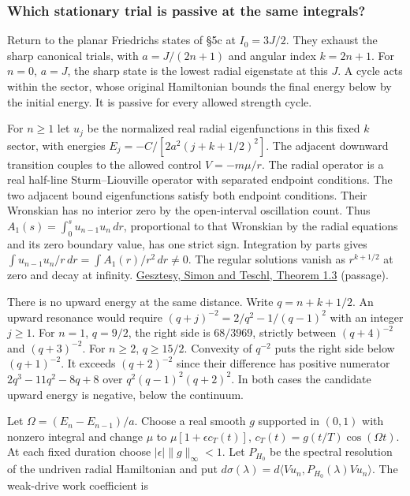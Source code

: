\documentclass[11pt,a4paper]{article}
\begin{document}
\subsubsection{Which stationary trial is passive at the same
integrals?}\label{which-stationary-trial-is-passive-at-the-same-integrals}

Return to the planar Friedrichs states of §5c at \(I_0=3J/2\). They
exhaust the sharp canonical trials, with \(a=J/(2n+1)\) and angular
index \(k=2n+1\). For \(n=0\), \(a=J\), the sharp state is the lowest
radial eigenstate at this \(J\). A cycle acts within the sector, whose
original Hamiltonian bounds the final energy below by the initial
energy. It is passive for every allowed strength cycle.

For \(n\ge1\) let \(u_j\) be the normalized real radial eigenfunctions
in this fixed \(k\) sector, with energies \(E_j=-C/[2a^2(j+k+1/2)^2]\).
The adjacent downward transition couples to the allowed control
\(V=-m\mu/r\). The radial operator is a real half-line Sturm--Liouville
operator with separated endpoint conditions. The two adjacent bound
eigenfunctions satisfy both endpoint conditions. Their Wronskian has no
interior zero by the open-interval oscillation count. Thus
\(A_1(s)=\int_0^s u_{n-1}u_n\,dr\), proportional to that Wronskian by
the radial equations and its zero boundary value, has one strict sign.
Integration by parts gives
\(\int u_{n-1}u_n/r\,dr=\int A_1(r)/r^2\,dr\ne0\). The regular solutions
vanish as \(r^{k+1/2}\) at zero and decay at infinity.
\href{https://math.caltech.edu/papers/bsimon/p252.pdf}{Gesztesy, Simon
and Teschl, Theorem 1.3} (passage).

There is no upward energy at the same distance. Write \(q=n+k+1/2\). An
upward resonance would require \((q+j)^{-2}=2/q^2-1/(q-1)^2\) with an
integer \(j\ge1\). For \(n=1\), \(q=9/2\), the right side is
\(68/3969\), strictly between \((q+4)^{-2}\) and \((q+3)^{-2}\). For
\(n\ge2\), \(q\ge15/2\). Convexity of \(q^{-2}\) puts the right side
below \((q+1)^{-2}\). It exceeds \((q+2)^{-2}\) since their difference
has positive numerator \(2q^3-11q^2-8q+8\) over \(q^2(q-1)^2(q+2)^2\).
In both cases the candidate upward energy is negative, below the
continuum.

Let \(\Omega=(E_n-E_{n-1})/a\). Choose a real smooth \(g\) supported in
\((0,1)\) with nonzero integral and change \(\mu\) to
\(\mu[1+\epsilon c_T(t)]\), \(c_T(t)=g(t/T)\cos(\Omega t)\). At each
fixed duration choose \(|\epsilon|\|g\|_\infty<1\). Let \(P_{H_0}\) be
the spectral resolution of the undriven radial Hamiltonian and put
\(d\sigma(\lambda)=d\langle Vu_n,P_{H_0}(\lambda)Vu_n\rangle\). The
weak-drive work coefficient is
\end{document}
